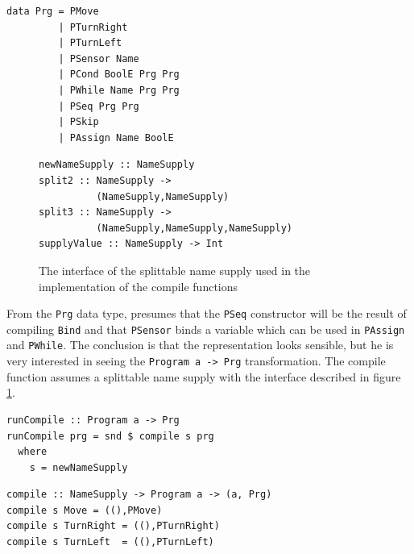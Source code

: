 \begin{small} 
\begin{verbatim}
data Prg = PMove          
         | PTurnRight
         | PTurnLeft
         | PSensor Name  
         | PCond BoolE Prg Prg
         | PWhile Name Prg Prg 
         | PSeq Prg Prg
         | PSkip       
         | PAssign Name BoolE
\end{verbatim}
\end{small}

\begin{figure} 
\begin{small}
\begin{verbatim} 
newNameSupply :: NameSupply 
split2 :: NameSupply -> 
          (NameSupply,NameSupply) 
split3 :: NameSupply -> 
          (NameSupply,NameSupply,NameSupply)
supplyValue :: NameSupply -> Int 
\end{verbatim} 
\end{small}
\caption{The interface of the splittable name supply used in the implementation 
of the compile functions} 
\label{fig:namesupply}
\end{figure}

From the {\tt Prg} data type, \docname{} presumes that the {\tt PSeq}
constructor will be the result of compiling {\tt Bind} and that
{\tt PSensor} binds a variable which can be used in {\tt PAssign} and
{\tt PWhile}. The conclusion is that the representation looks
sensible, but he is very interested in seeing the {\tt Program a -> Prg}
transformation. The compile function assumes a splittable name
supply with the interface described in figure \ref{fig:namesupply}.

\begin{small} 
\begin{verbatim}
runCompile :: Program a -> Prg
runCompile prg = snd $ compile s prg 
  where 
    s = newNameSupply
\end{verbatim}
\end{small}
    
\begin{small}
\begin{verbatim}
compile :: NameSupply -> Program a -> (a, Prg) 
compile s Move = ((),PMove)
compile s TurnRight = ((),PTurnRight)
compile s TurnLeft  = ((),PTurnLeft)
\end{verbatim}
\end{small}

\pagebreak

